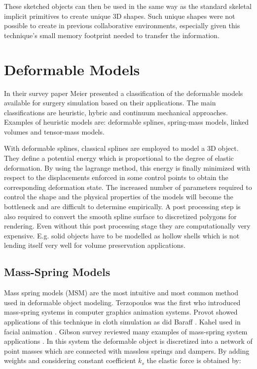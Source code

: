 These sketched objects can then be used in the same way as the standard skeletal implicit primitives to create unique 3D shapes. Such 
unique shapes were not possible to create in previous collaborative environments, especially given this technique’s small memory footprint 
needed to transfer the information.

\section{Deformable Models}
In their survey paper Meier \etal \cite{Meier2005} presented a classification of the deformable models available for surgery 
simulation based on their applications. The main classifications are heuristic, hybric and continuum mechanical approaches.
Examples of heuristic models are: deformable splines, spring-mass models, linked volumes and tensor-mass models. 

With deformable splines, classical splines are employed to model a 3D object. They define a potential energy which is proportional
to the degree of elastic deformation. By using the lagrange method, this energy is finally minimized with respect to the displacements
enforced in some control points to obtain the corresponding deformation state. The increased number of parameters required to control
the shape and the physical properties of the models will become the bottleneck and are difficult to determine empirically. A post processing
step is also required to convert the smooth spline surface to discretized polygons for rendering. Even without this post processing stage
they are computationally very expensive. E.g. solid objects have to be modelled as hollow shells which is not lending itself very well for
volume preservation applications.

\subsection{Mass-Spring Models}
Mass spring models (MSM) are the most intuitive and most common method used in deformable object modeling.
Terzopoulos \etal \cite{terzopoulos1988modeling, terzopoulos1987elastically} was the first who introduced mass-spring systems in 
computer graphics animation systems. Provot \etal showed applications of this technique in cloth simulation \cite{provot1995deformation}
as did Baraff \etal \cite{baraff1998large}. Kahel \etal used in facial animation \cite{kahler2001geometry}. 
Gibson \etal survey reviewed many examples of mass-spring system applications \cite{Gibson1997a}. In this system the deformable object
is discretized into a network of point masses which are connected with massless springs and dampers. By adding weights and considering
constant coefficient $k_s$ the elastic force is obtained by:

